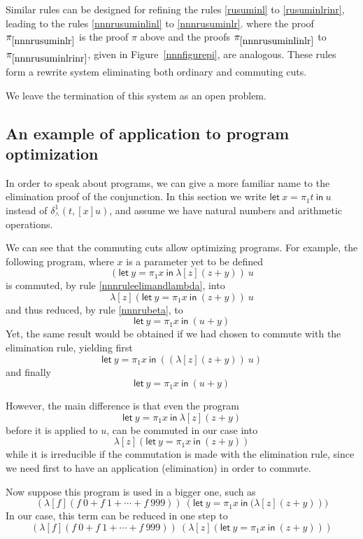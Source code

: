 \documentclass[screen, sigconf,authorversion,nonacm]{acmart}
\theoremstyle{acmdefinition}
\numberwithin{equation}{section}
\newcommand\abstr[1]{[#1]}
\newcommand\elimand{\delta_{\wedge}}
\begin{document}
Similar rules can be designed for refining the rules \eqref{rusuminl}
to \eqref{rusuminlrinr}, leading to the rules \eqref{nnnrusuminlinl}
to \eqref{nnnrusuminlr}.  where the proof $\pi_{\ref{nnnrusuminlr}}$
is the proof $\pi$ above and the proofs $\pi_{\ref{nnnrusuminlinlr}}$
to $\pi_{\ref{nnnrusuminlrinr}}$, given in Figure~\ref{nnnfigurepi},
are analogous.  These rules form a rewrite system eliminating both
ordinary and commuting cuts.

We leave the termination of this system as an open problem.


\subsection{An example of application to program optimization}
\label{sec:optimization}

\newcommand\tletp[4]{\mathsf{let}\ {#2}=\pi_{#1}{#3}\ \mathsf{in}\ {#4}}
\newcommand\tmatch[5]{\mathsf{match}\ {#1}\ \mathsf{in}\ \{{#2}\mapsto{#3},{#4}\mapsto{#5}\}}
In order to speak about programs, we can give a more familiar name to
the elimination proof of the conjunction. In this section we write
$\tletp 1 x t u$ instead of $\elimand^1(t,\abstr{x}u)$, and assume we
have natural numbers and arithmetic operations.

We can see that the commuting cuts allow optimizing programs. For example, the following program, where $x$ is a parameter yet to be defined
\[
  (\tletp 1 yx{\lambda\abstr{z}(z+y)})~u
\]
is commuted, by rule \eqref{nnnruleelimandlambda}, into
\[
  \lambda\abstr{z}(\tletp 1 yx{(z+y)})~u
\]
and thus reduced, by rule \eqref{nnnrubeta}, to
\[
  \tletp 1 yx{(u+y)}
\]
Yet, the same result would be obtained if we had chosen to commute
with the elimination rule, yielding first
\[
  \tletp 1 yx{((\lambda\abstr{z}(z+y))~u)}
\]
and finally
\[
  \tletp 1 yx{(u+y)}
\]

However, the main difference is that even the program
\[
  \tletp 1 yx{\lambda\abstr{z}(z+y)}
\]
before it is applied to $u$, can be commuted in our case into
\[
  \lambda\abstr{z}(\tletp 1 yx{(z+y)})
\]
while it is irreducible if the commutation is made with the
elimination rule, since we need first to have an application
(elimination) in order to commute.

Now suppose this program is used in a bigger one, such as
\[
  (\lambda\abstr{f}(f~0+f~1+\cdots+f~999))~{(\tletp 1 yx{(\lambda\abstr{z}(z+y)}))}
\]
In our case, this term can be reduced in one step to
\[
  (\lambda\abstr{f}(f~0+f~1+\cdots+f~999))~(\lambda\abstr{z}(\tletp 1 yx{(z+y)}))
\]
\pagebreak
\end{document}
